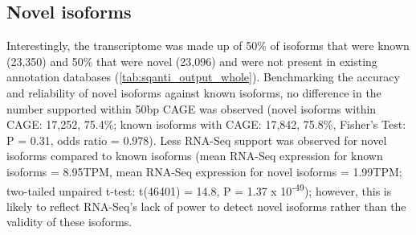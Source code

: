 \subsection{Novel isoforms}
\label{sec:whole_novelIso}
Interestingly, the transcriptome was made up of 50\% of isoforms that were known (23,350) and 50\% that were novel (23,096) and were not present in existing annotation databases (\cref{tab:sqanti_output_whole}). Benchmarking the accuracy and reliability of novel isoforms against known isoforms, no difference in the number supported within 50bp CAGE was observed (novel isoforms within CAGE: 17,252, 75.4\%; known isoforms with CAGE: 17,842, 75.8\%, Fisher's Test: P = 0.31, odds ratio = 0.978). Less RNA-Seq support was observed for novel isoforms compared to known isoforms (mean RNA-Seq expression for known isoforms = 8.95TPM, mean RNA-Seq expression for novel isoforms = 1.99TPM; two-tailed unpaired t-test: t(46401) = 14.8, P = 1.37 x 10\textsuperscript{-49}); however, this is likely to reflect RNA-Seq's lack of power to detect novel isoforms rather than the validity of these isoforms. 

